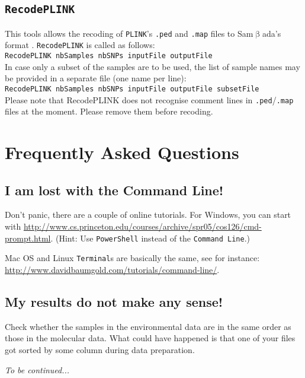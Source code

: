 \documentclass[a4paper,11pt]{article}
\newcommand{\smb}{\textsf{Sam$\upbeta$ada}}
\newcommand{\prog}[1]{\texttt{#1}}
\begin{document}
\subsection{\prog{RecodePLINK}}
This tools allows the recoding of \prog{PLINK}'s \prog{.ped} and \prog{.map} files to \smb's format \parencite[see][for further information on this format]{purcell:2009}.
\prog{RecodePLINK} is called as follows:\\
\verb+RecodePLINK nbSamples nbSNPs inputFile outputFile+\\
In case only a subset of the samples are to be used, the list of sample names may be provided in a separate file (one name per line):\\
\verb+RecodePLINK nbSamples nbSNPs inputFile outputFile subsetFile+\\
Please note that RecodePLINK does not recognise comment lines in \prog{.ped}/\prog{.map} files at the moment. 
Please remove them before recoding.

\clearpage

\section{Frequently Asked Questions}

\subsection*{I am lost with the Command Line! \label{faq:commandline}}
Don't panic, there are a couple of online tutorials.
For Windows, you can start with \url{http://www.cs.princeton.edu/courses/archive/spr05/cos126/cmd-prompt.html}.
(Hint: Use \prog{PowerShell} instead of the \prog{Command Line}.)

Mac OS and Linux \prog{Terminal}s are basically the same, see for instance: \url{http://www.davidbaumgold.com/tutorials/command-line/}. 

\subsection*{My results do not make any sense! \label{faq:nonsense}}
Check whether the samples in the environmental data are in the same order as those in the molecular data.
What could have happened is that one of your files got sorted by some column during data preparation.

\vspace{1cm}

\textit{To be continued...}
\clearpage

\printbibliography[heading=bibintoc]
\end{document}
